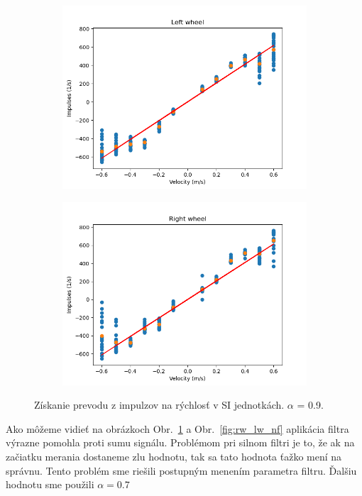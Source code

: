\begin{figure}[!htbp]
	\begin{subfigure}{0.5\textwidth}
		\includegraphics[width=\textwidth]{img/lw_09250.png}
	\end{subfigure}
	\hfill
	\begin{subfigure}{0.5\textwidth}
		\includegraphics[width=\textwidth]{img/rw_09250.png}
	\end{subfigure}
	\caption{Získanie prevodu z impulzov na rýchlosť v SI jednotkách. \(\alpha\) = 0.9.}
	\label{fig:rw_lw_09250}
\end{figure}

Ako môžeme vidieť na obrázkoch Obr.~\ref{fig:rw_lw_09250} a Obr.~\ref{fig:rw_lw_nf} aplikácia filtra výrazne pomohla proti sumu signálu.
Problémom pri silnom filtri je to, že ak na začiatku merania dostaneme zlu hodnotu, tak sa tato hodnota ťažko mení na správnu.
Tento problém sme riešili postupným menením parametra filtru. Ďalšiu hodnotu sme použili \(\alpha = 0.7\)

